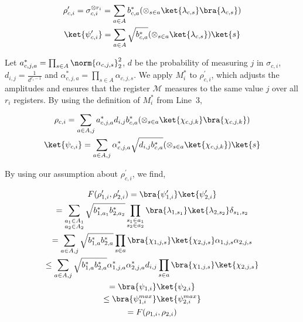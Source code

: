 \[\begin{gathered}
\displaystyle\rho^{\prime}_{c,i} \displaystyle=\sigma_{c,i}^{\otimes r_{i}}=\sum_{a\in A}b^{*}_{c,a}(\otimes_{s\in a}\ket{\lambda_{c,s}}\bra{\lambda_{c,s}}) \\
\displaystyle\ket{\psi^{\prime}_{c,i}} \displaystyle=\sum_{a\in A}\sqrt{b^{*}_{c,a}}(\otimes_{s\in a}\ket{\lambda_{c,s}})\ket{s}
\end{gathered}\]


Let $a^{*}_{c,j,a}=\prod_{s\in A}\norm{\alpha_{c,j,s}}_{2}^{2}$, $d$ be the probability of measuring $j$ in $\sigma_{c,i}$, $d_{i,j}=\frac{1}{d^{r_{i}-1}}$ and $\alpha^{*}_{c,j,a}=\prod_{s\in A}\alpha_{c,j,s}$.
We apply $M^{*}_{i}$ to $\rho^{\prime}_{c,i}$, which adjusts the amplitudes and ensures that the register $\mathcal{M}$ measures to the same value $j$ over all $r_{i}$ registers. By using the definition of $M^{*}_{i}$ from Line 3,\par


\[\begin{gathered}
\displaystyle\rho_{c,i} \displaystyle=\sum_{a\in A,j}a^{*}_{c,j,a}d_{i,j}b^{*}_{c,a}(\otimes_{s\in a}\ket{\chi_{c,j,k}}\bra{\chi_{c,j,k}}) \\
\displaystyle\ket{\psi_{c,i}} \displaystyle=\sum_{a\in A,j}\alpha^{*}_{c,j,a}\sqrt{d_{i,j}b^{*}_{c,a}}(\otimes_{s\in a}\ket{\chi_{c,j,k}})\ket{s}
\end{gathered}\]


By using our assumption about $\rho^{\prime}_{c,i}$, we find,\par


\[\begin{gathered}
\displaystyle F(\rho^{\prime}_{1,i},\rho^{\prime}_{2,i}) \displaystyle=\bra{\psi^{\prime}_{1,i}}\ket{\psi^{\prime}_{2,i}} \\
\displaystyle=\sum_{\begin{subarray}{c}a_{1}\in A_{1}\\
a_{2}\in A_{2}\end{subarray}}\sqrt{b^{*}_{1,a_{1}}b^{*}_{2,a_{2}}}\prod_{\begin{subarray}{c}s_{1}\in a_{1}\\
s_{2}\in a_{2}\end{subarray}}\bra{\lambda_{1,s_{1}}}\ket{\lambda_{2,s_{2}}}\delta_{s_{1},s_{2}} \\
\displaystyle=\sum_{a\in A,j}\sqrt{b^{*}_{1,a}b^{*}_{2,a}}\prod_{s\in a}\bra{\chi_{1,j,s}}\ket{\chi_{2,j,s}}\alpha_{1,j,s}\alpha_{2,j,s} \\
\displaystyle\leq\sum_{a\in A,j}\sqrt{b^{*}_{1,a}b^{*}_{2,a}}\alpha^{*}_{1,j,a}\alpha^{*}_{2,j,a}d_{i,j}\prod_{s\in a}\bra{\chi_{1,j,s}}\ket{\chi_{2,j,s}} \\
\displaystyle=\bra{\psi_{1,i}}\ket{\psi_{2,i}} \\
\displaystyle\leq\bra{\psi^{max}_{1,i}}\ket{\psi^{max}_{2,i}} \\
\displaystyle=F(\rho_{1,i},\rho_{2,i})
\end{gathered}\]


